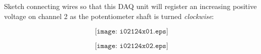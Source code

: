 

Sketch connecting wires so that this DAQ unit will register an increasing positive voltage on channel 2 as the potentiometer shaft is turned {\it clockwise}:

$$\texttt{[image: i02124x01.eps]}$$







$$\texttt{[image: i02124x02.eps]}$$











